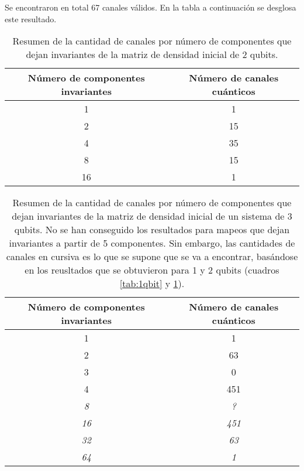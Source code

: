 \documentclass[11pt]{article}
\begin{document}
\noindent Se encontraron en total 67 canales válidos. En la tabla a continuación se desglosa este resultado. 
\begin{table}[H]
\centering
\begin{tabular}{|c|c|}
\hline
\textbf{Número de componentes invariantes} & \textbf{Número de canales cuánticos} \\ \hline
1                                 & 1                           \\ \hline
2                                 & 15                          \\ \hline
4                                 & 35                          \\ \hline
8                                 & 15                          \\ \hline
16                                & 1                           \\ \hline
\end{tabular}
\caption{Resumen de la cantidad de canales por número de componentes que dejan invariantes de la matriz de densidad inicial de 2 qubits. }
\label{tab:2qbits}
\end{table}

\begin{table}[H]
\centering
\begin{tabular}{|c|c|}
\hline
\textbf{Número de componentes invariantes} & \textbf{Número de canales cuánticos} \\ \hline
1                                          & 1                                    \\ \hline
2                                          & 63                                   \\ \hline
3                                          & 0                                    \\ \hline
4                                          & 451                                  \\ \hline
\textit{8}                                 & \textit{?}                           \\ \hline
\textit{16}                                & \textit{451}                         \\ \hline
\textit{32}                                & \textit{63}                          \\ \hline
\textit{64}                                & \textit{1}                           \\ \hline
\end{tabular}
\caption{Resumen de la cantidad de canales por número de componentes que dejan invariantes de la matriz de densidad inicial de un sistema de 3 qubits. No se han conseguido los resultados para mapeos que dejan invariantes a partir de 5 componentes. Sin embargo, las cantidades de canales en cursiva es lo que se supone que se va a encontrar, basándose en los reusltados que se obtuvieron para 1 y 2 qubits (cuadros \ref{tab:1qbit} y \ref{tab:2qbits}).}
\end{table}



	

	

	
	
	
	
\end{document}

